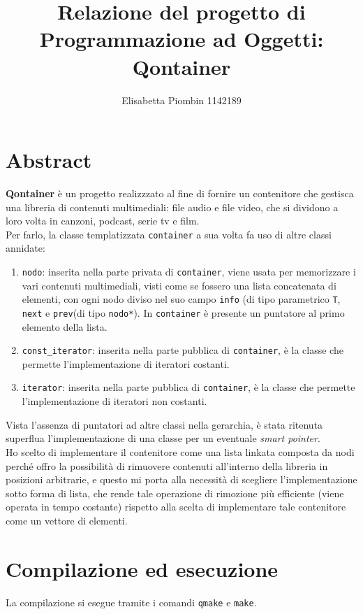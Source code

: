 \documentclass[a4paper,10pt]{article}
\begin{document}
\title {Relazione del progetto di Programmazione ad Oggetti: Qontainer}
\author {Elisabetta Piombin 1142189}
\date{}

\maketitle
\clearpage
\tableofcontents
\clearpage\mbox{}

\section{Abstract}
\textbf{Qontainer} è un progetto realizzzato al fine di fornire un contenitore che gestisca una libreria di contenuti multimediali: file audio e file video, che si dividono a loro volta in canzoni, podcast, serie tv e film. \\
Per farlo, la classe templatizzata \texttt{container} a sua volta fa uso di altre classi annidate:
\begin{enumerate}
\item \texttt{nodo}: inserita nella parte privata di \texttt{container}, viene usata per memorizzare i vari contenuti multimediali, visti come se fossero una lista concatenata di elementi, con ogni nodo diviso nel suo campo \texttt{info} (di tipo parametrico \texttt{T}, \texttt{next} e \texttt{prev}(di tipo \texttt{nodo*}). In \texttt{container} è presente un puntatore al primo elemento della lista.
\item \texttt{const\_iterator}: inserita nella parte pubblica di \texttt{container}, è la classe che permette l'implementazione di iteratori costanti.
\item \texttt{iterator}: inserita nella parte pubblica di \texttt{container}, è la classe che permette l'implementazione di iteratori non costanti.
\end{enumerate}
Vista l'assenza di puntatori ad altre classi nella gerarchia, è stata ritenuta superflua l'implementazione di una classe per un eventuale \textit{smart pointer}.\\
Ho scelto di implementare il contenitore come una lista linkata composta da nodi perché offro la possibilità di rimuovere contenuti all'interno della libreria in posizioni arbitrarie, e questo mi porta alla necessità di scegliere l'implementazione sotto forma di lista, che rende tale operazione di rimozione più efficiente (viene operata in tempo costante) rispetto alla scelta di implementare tale contenitore come un vettore di elementi.


\section{Compilazione ed esecuzione}
La compilazione si esegue tramite i comandi \texttt{qmake} e \texttt{make}. 
\end{document}
